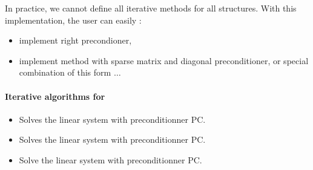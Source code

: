 In practice, we cannot define all iterative methods for all structures.
With this implementation, the user can easily :
\begin{itemize}
\item implement right precondioner, 
\item implement method with sparse matrix and diagonal preconditioner, or
  special combination of this form $\dots$
\end{itemize}


\paragraph{Iterative algorithms for }


\begin{itemize}
\item {}
  \sshortdescribe Solves the linear system  with preconditionner PC.  
\item {}
  \sshortdescribe Solves the linear system  with preconditionner PC.  
\item {}
  \sshortdescribe Solve the linear system  with preconditionner PC.
\end{itemize}

